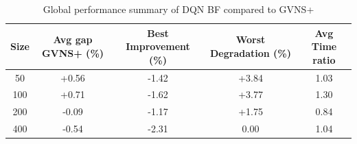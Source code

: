 \begin{table}[ht]
\centering
\footnotesize
\setlength{\tabcolsep}{4pt}
\caption{Global performance summary of DQN BF compared to GVNS+}
\vspace{3mm}
\begin{tabular}{c c c c c}
\toprule
\textbf{Size} & \textbf{Avg gap GVNS+ (\%)} & \textbf{Best Improvement (\%)} & \textbf{Worst Degradation (\%)} & \textbf{Avg Time ratio} \\
\midrule
50  & +0.56 & -1.42 & +3.84  & 1.03 \\
100 & +0.71 & -1.62 & +3.77  & 1.30 \\
200 & -0.09 & -1.17 & +1.75  & 0.84 \\
400 & -0.54 & -2.31 &  0.00  & 1.04 \\
\bottomrule
\end{tabular}
\label{tab:dqn_bf_summary}
\end{table}